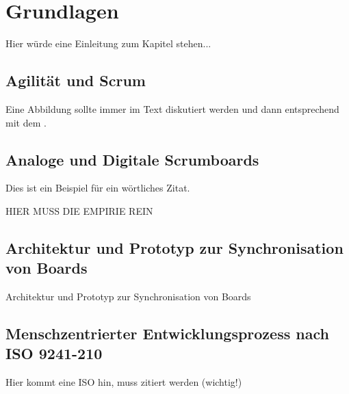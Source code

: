 \chapter{Grundlagen}
\label{cha:Grundlagen}
Hier würde eine Einleitung zum Kapitel stehen... 

\section{Agilität und Scrum}
\label{sec:agilitaet_scrum}

Eine Abbildung sollte immer im Text diskutiert werden und dann entsprechend mit dem .

\section{Analoge und Digitale Scrumboards}
\label{sec:digitale_analoge_boards}
Dies ist ein Beispiel für ein wörtliches Zitat.

HIER MUSS DIE EMPIRIE REIN

\section{Architektur und Prototyp zur Synchronisation von Boards}
\label{sec:architektur_prototyp_sync}

Architektur und Prototyp zur Synchronisation von Boards

\section{Menschzentrierter Entwicklungsprozess nach ISO 9241-210}
\label{sec:menschzentrierte_entwicklung_iso9241}

Hier kommt eine ISO hin, muss zitiert werden (wichtig!)
